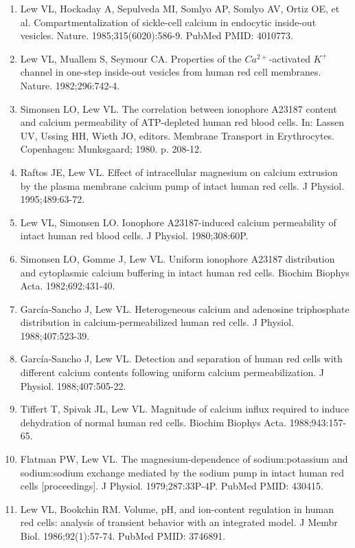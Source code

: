 \documentclass[a4paper]{article}
\begin{document}
\begin{enumerate}
\item Lew VL, Hockaday A, Sepulveda MI, Somlyo AP, Somlyo AV, Ortiz OE, et al. Compartmentalization of sickle-cell calcium in endocytic inside-out vesicles. Nature. 1985;315(6020):586-9. PubMed PMID: 4010773.
\item Lew VL, Muallem S, Seymour CA. Properties of the $Ca^{2+}$-activated $K^+$ channel in one-step inside-out vesicles from human red cell membranes. Nature. 1982;296:742-4.
\item Simonsen LO, Lew VL. The correlation between ionophore A23187 content and calcium permeability of ATP-depleted human red blood cells. In: Lassen UV, Ussing HH, Wieth JO, editors. Membrane Transport in Erythrocytes. Copenhagen: Munksgaard; 1980. p. 208-12.
\item Raftos JE, Lew VL. Effect of intracellular magnesium on calcium extrusion by the plasma membrane calcium pump of intact human red cells. J Physiol. 1995;489:63-72.
\item Lew VL, Simonsen LO. Ionophore A23187-induced calcium permeability of intact human red blood cells. J Physiol. 1980;308:60P.
\item Simonsen LO, Gomme J, Lew VL. Uniform ionophore A23187 distribution and cytoplasmic calcium buffering in intact human red cells. Biochim Biophys Acta. 1982;692:431-40.
\item García-Sancho J, Lew VL. Heterogeneous calcium and adenosine triphosphate distribution in calcium-permeabilized human red cells. J Physiol. 1988;407:523-39.
\item García-Sancho J, Lew VL. Detection and separation of human red cells with different calcium contents following uniform calcium permeabilization. J Physiol. 1988;407:505-22.
\item Tiffert T, Spivak JL, Lew VL. Magnitude of calcium influx required to induce dehydration of normal human red cells. Biochim Biophys Acta. 1988;943:157-65.
\item Flatman PW, Lew VL. The magnesium-dependence of sodium:potassium and sodium:sodium exchange mediated by the sodium pump in intact human red cells [proceedings]. J Physiol. 1979;287:33P-4P. PubMed PMID: 430415.
\item Lew VL, Bookchin RM. Volume, pH, and ion-content regulation in human red cells: analysis of transient behavior with an integrated model. J Membr Biol. 1986;92(1):57-74. PubMed PMID: 3746891.
\end{enumerate}
\end{document}
